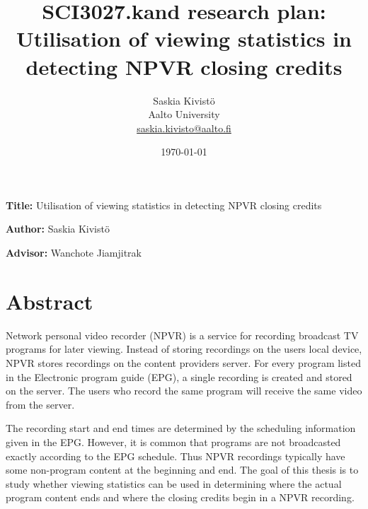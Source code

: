 \documentclass[12pt,a4paper,english,oneside]{article}
\begin{document}
\title{SCI3027.kand research plan:\\[5mm]
Utilisation of viewing statistics in detecting NPVR closing credits}

\author{Saskia Kivistö\\
Aalto University\\
\url{saskia.kivisto@aalto.fi}}

\date{\today}

\maketitle




\textbf{Title:} Utilisation of viewing statistics in detecting NPVR closing credits

\textbf{Author:} Saskia Kivistö

\textbf{Advisor:} Wanchote Jiamjitrak

\section{Abstract}

Network personal video recorder (NPVR) is a service for recording broadcast TV programs for later viewing. Instead of storing recordings on the users local device, NPVR stores recordings on the content providers server. For every program listed in the Electronic program guide (EPG), a single recording is created and stored on the server. The users who record the same program will receive the same video from the server.

The recording start and end times are determined by the scheduling information given in the EPG. However, it is common that programs are not broadcasted exactly according to the EPG schedule. Thus NPVR recordings typically have some non-program content at the beginning and end. The goal of this thesis is to study whether viewing statistics can be used in determining where the actual program content ends and where the closing credits begin in a NPVR recording.

\end{document}
